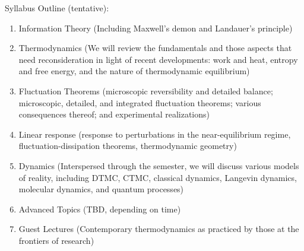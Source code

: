 \documentclass[article,notes]{bespoke6}
\begin{document}
Syllabus Outline (tentative):
\begin{enumerate}
  \item Information Theory (Including Maxwell's demon and Landauer's principle)
  \item Thermodynamics (We will review the fundamentals and those aspects that need reconsideration in light of recent developments: work and heat, entropy and free energy, and the nature of thermodynamic equilibrium) 
  \item Fluctuation Theorems (microscopic reversibility and detailed balance; microscopic, detailed, and integrated fluctuation theorems; various consequences thereof; and experimental realizations)
  \item Linear response (response to perturbations in the near-equilibrium regime, fluctuation-dissipation theorems, thermodynamic geometry)
  \item Dynamics (Interspersed through the semester, we will discuss various models of reality, including DTMC, CTMC, classical dynamics, Langevin dynamics, molecular dynamics, and quantum processes)
  \item Advanced Topics (TBD, depending on time)
  \item Guest Lectures (Contemporary thermodynamics as practiced by those at the frontiers of research)
\end{enumerate}

\newpage



\clearpage



\clearpage





\clearpage





\end{document}
